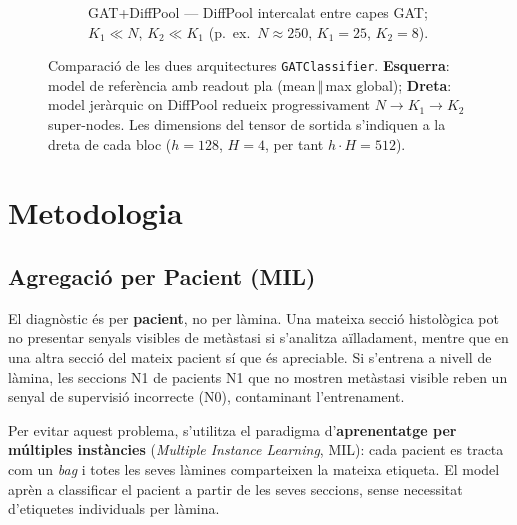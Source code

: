 \documentclass[10pt,a4paper,twocolumn,twoside]{article}
\begin{document}
\begin{figure}[t]
\begin{subfigure}[t]{0.50\textwidth}
\caption{GAT+DiffPool — DiffPool intercalat entre capes GAT; $K_1\!\ll\!N$,
$K_2\!\ll\!K_1$ (p.~ex.\ $N\!\approx\!250$, $K_1\!=\!25$, $K_2\!=\!8$).}
\label{fig:arch-diffpool}
\end{subfigure}

\caption{Comparació de les dues arquitectures \texttt{GATClassifier}.
\textbf{Esquerra}: model de referència amb readout pla (mean\,$\Vert$\,max global);
\textbf{Dreta}: model jeràrquic on DiffPool redueix progressivament $N\!\to\!K_1\!\to\!K_2$
super-nodes. Les dimensions del tensor de sortida s'indiquen a la dreta de cada bloc
($h\!=\!128$, $H\!=\!4$, per tant $h{\cdot}H\!=\!512$).}
\label{fig:arch}
\end{figure}

\section{Metodologia}

\subsection{Agregació per Pacient (MIL)}
\label{sec:mil}

El diagnòstic és per \textbf{pacient}, no per làmina. Una mateixa secció histològica pot no presentar senyals
visibles de metàstasi si s'analitza aïlladament, mentre que en una altra secció del mateix pacient sí que és
apreciable. Si s'entrena a nivell de làmina, les seccions N1 de pacients N1 que no mostren metàstasi visible
reben un senyal de supervisió incorrecte (N0), contaminant l'entrenament.

Per evitar aquest problema, s'utilitza el paradigma d'\textbf{aprenentatge per múltiples instàncies}
(\textit{Multiple Instance Learning}, MIL): cada pacient es tracta com un \textit{bag} i totes les seves
làmines comparteixen la mateixa etiqueta. El model aprèn a classificar el pacient a partir de les
seves seccions, sense necessitat d'etiquetes individuals per làmina.
\end{document}
